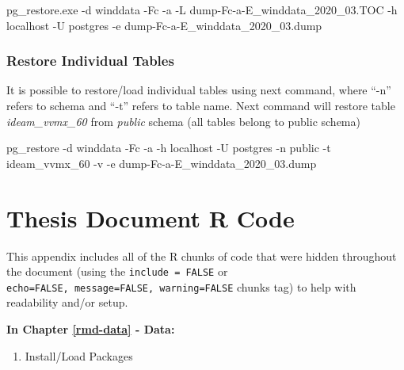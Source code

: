\documentclass[12pt,oneside]{reedthesis}
\newenvironment{Shaded}{\begin{snugshade}}{\end{snugshade}}
\newcommand{\ExtensionTok}[1]{#1}
\newcommand{\NormalTok}[1]{#1}
\providecommand{\tightlist}{%
  \setlength{\itemsep}{0pt}\setlength{\parskip}{0pt}}
\begin{document}
\scriptsize

\vspace{0.4cm}
\begin{Shaded}
\begin{Highlighting}[]
      \ExtensionTok{pg_restore.exe}\NormalTok{ -d winddata -Fc -a -L dump-Fc-a-E_winddata_2020_03.TOC -h localhost -U postgres}
       \ExtensionTok{-e}\NormalTok{ dump-Fc-a-E_winddata_2020_03.dump}
\end{Highlighting}
\end{Shaded}
\normalsize

\hypertarget{restore-individual-tables}{%
\subsection{Restore Individual Tables}\label{restore-individual-tables}}

It is possible to restore/load individual tables using next command, where ``-n'' refers to schema and ``-t'' refers to table name. Next command will restore table \emph{ideam\_vvmx\_60} from \emph{public} schema (all tables belong to public schema)

\scriptsize

\vspace{0.4cm}
\begin{Shaded}
\begin{Highlighting}[]
      \ExtensionTok{pg_restore}\NormalTok{ -d winddata -Fc -a -h localhost -U postgres -n public -t ideam_vvmx_60 -v }
       \ExtensionTok{-e}\NormalTok{ dump-Fc-a-E_winddata_2020_03.dump}
\end{Highlighting}
\end{Shaded}
\normalsize

\hypertarget{docrcode}{%
\chapter{Thesis Document R Code}\label{docrcode}}

This appendix includes all of the R chunks of code that were hidden throughout the document (using the \texttt{include\ =\ FALSE} or \texttt{echo=FALSE,\ message=FALSE,\ warning=FALSE} chunks tag) to help with readability and/or setup.

\textbf{In Chapter \ref{rmd-data} - Data:}
\begin{enumerate}
\def\labelenumi{\arabic{enumi}.}
\tightlist
\item
  Install/Load Packages
\end{enumerate}
\tiny
\end{document}

